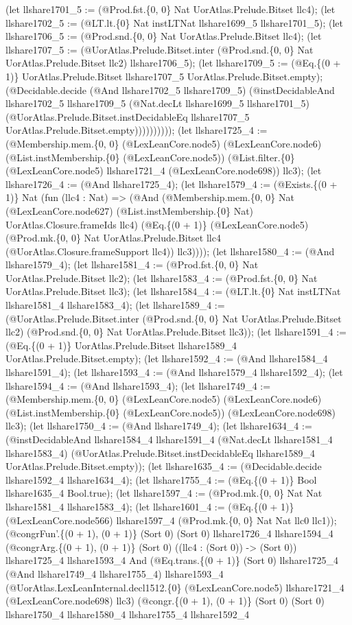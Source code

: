 \documentclass[11pt]{article}
\begin{document}
(let llshare1701\_5 := (@Prod.fst.\{0, 0\} Nat UorAtlas.Prelude.Bitset llc4); (let llshare1702\_5 := (@LT.lt.\{0\} Nat instLTNat llshare1699\_5 llshare1701\_5); (let llshare1706\_5 := (@Prod.snd.\{0, 0\} Nat UorAtlas.Prelude.Bitset llc4); (let llshare1707\_5 := (@UorAtlas.Prelude.Bitset.inter (@Prod.snd.\{0, 0\} Nat UorAtlas.Prelude.Bitset llc2) llshare1706\_5); (let llshare1709\_5 := (@Eq.\{(0 + 1)\} UorAtlas.Prelude.Bitset llshare1707\_5 UorAtlas.Prelude.Bitset.empty); (@Decidable.decide (@And llshare1702\_5 llshare1709\_5) (@instDecidableAnd llshare1702\_5 llshare1709\_5 (@Nat.decLt llshare1699\_5 llshare1701\_5) (@UorAtlas.Prelude.Bitset.instDecidableEq llshare1707\_5 UorAtlas.Prelude.Bitset.empty)))))))))); (let llshare1725\_4 := (@Membership.mem.\{0, 0\} (@LexLeanCore.node5) (@LexLeanCore.node6) (@List.instMembership.\{0\} (@LexLeanCore.node5)) (@List.filter.\{0\} (@LexLeanCore.node5) llshare1721\_4 (@LexLeanCore.node698)) llc3); (let llshare1726\_4 := (@And llshare1725\_4); (let llshare1579\_4 := (@Exists.\{(0 + 1)\} Nat (fun (llc4 : Nat) => (@And (@Membership.mem.\{0, 0\} Nat (@LexLeanCore.node627) (@List.instMembership.\{0\} Nat) UorAtlas.Closure.frameIds llc4) (@Eq.\{(0 + 1)\} (@LexLeanCore.node5) (@Prod.mk.\{0, 0\} Nat UorAtlas.Prelude.Bitset llc4 (@UorAtlas.Closure.frameSupport llc4)) llc3)))); (let llshare1580\_4 := (@And llshare1579\_4); (let llshare1581\_4 := (@Prod.fst.\{0, 0\} Nat UorAtlas.Prelude.Bitset llc2); (let llshare1583\_4 := (@Prod.fst.\{0, 0\} Nat UorAtlas.Prelude.Bitset llc3); (let llshare1584\_4 := (@LT.lt.\{0\} Nat instLTNat llshare1581\_4 llshare1583\_4); (let llshare1589\_4 := (@UorAtlas.Prelude.Bitset.inter (@Prod.snd.\{0, 0\} Nat UorAtlas.Prelude.Bitset llc2) (@Prod.snd.\{0, 0\} Nat UorAtlas.Prelude.Bitset llc3)); (let llshare1591\_4 := (@Eq.\{(0 + 1)\} UorAtlas.Prelude.Bitset llshare1589\_4 UorAtlas.Prelude.Bitset.empty); (let llshare1592\_4 := (@And llshare1584\_4 llshare1591\_4); (let llshare1593\_4 := (@And llshare1579\_4 llshare1592\_4); (let llshare1594\_4 := (@And llshare1593\_4); (let llshare1749\_4 := (@Membership.mem.\{0, 0\} (@LexLeanCore.node5) (@LexLeanCore.node6) (@List.instMembership.\{0\} (@LexLeanCore.node5)) (@LexLeanCore.node698) llc3); (let llshare1750\_4 := (@And llshare1749\_4); (let llshare1634\_4 := (@instDecidableAnd llshare1584\_4 llshare1591\_4 (@Nat.decLt llshare1581\_4 llshare1583\_4) (@UorAtlas.Prelude.Bitset.instDecidableEq llshare1589\_4 UorAtlas.Prelude.Bitset.empty)); (let llshare1635\_4 := (@Decidable.decide llshare1592\_4 llshare1634\_4); (let llshare1755\_4 := (@Eq.\{(0 + 1)\} Bool llshare1635\_4 Bool.true); (let llshare1597\_4 := (@Prod.mk.\{0, 0\} Nat Nat llshare1581\_4 llshare1583\_4); (let llshare1601\_4 := (@Eq.\{(0 + 1)\} (@LexLeanCore.node566) llshare1597\_4 (@Prod.mk.\{0, 0\} Nat Nat llc0 llc1)); (@congrFun'.\{(0 + 1), (0 + 1)\} (Sort 0) (Sort 0) llshare1726\_4 llshare1594\_4 (@congrArg.\{(0 + 1), (0 + 1)\} (Sort 0) ((llc4 : (Sort 0)) -> (Sort 0)) llshare1725\_4 llshare1593\_4 And (@Eq.trans.\{(0 + 1)\} (Sort 0) llshare1725\_4 (@And llshare1749\_4 llshare1755\_4) llshare1593\_4 (@UorAtlas.LexLeanInternal.decl1512.\{0\} (@LexLeanCore.node5) llshare1721\_4 (@LexLeanCore.node698) llc3) (@congr.\{(0 + 1), (0 + 1)\} (Sort 0) (Sort 0) llshare1750\_4 llshare1580\_4 llshare1755\_4 llshare1592\_4 
\end{document}
